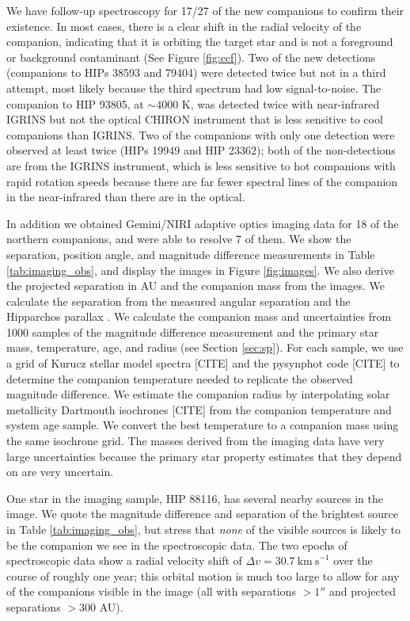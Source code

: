 \documentclass{emulateapj}
\begin{document}
We have follow-up spectroscopy for 17/27 of the new companions to confirm their existence. In most cases, there is a clear shift in the radial velocity of the companion, indicating that it is orbiting the target star and is not a foreground or background contaminant (See Figure \ref{fig:ccf}). Two of the new detections (companions to HIPs 38593 and 79404) were detected twice but not in a third attempt, most likely because the third spectrum had low signal-to-noise. The companion to HIP 93805, at $\sim 4000$ K, was detected twice with near-infrared IGRINS but not the optical CHIRON instrument that is less sensitive to cool companions than IGRINS. Two of the companions with only one detection were observed at least twice (HIPs 19949 and HIP 23362); both of the non-detections are from the IGRINS instrument, which is less sensitive to hot companions with rapid rotation speeds because there are far fewer spectral lines of the companion in the near-infrared than there are in the optical.


In addition we obtained Gemini/NIRI adaptive optics imaging data for 18 of the northern companions, and were able to resolve 7 of them. We show the separation, position angle, and magnitude difference measurements in Table \ref{tab:imaging_obs}, and display the images in Figure \ref{fig:images}. We also derive the projected separation in AU and the companion mass from the images. We calculate the separation from the measured angular separation and the Hipparchos parallax \citep{Hipparchos}. We calculate the companion mass and uncertainties from 1000 samples of the magnitude difference measurement and the primary star mass, temperature, age, and radius (see Section \ref{sec:sp}). For each sample, we use a grid of Kurucz stellar model spectra [CITE] and the pysynphot code [CITE] to determine the companion temperature needed to replicate the observed magnitude difference. We estimate the companion radius by interpolating solar metallicity Dartmouth isochrones [CITE] from the companion temperature and system age sample. We convert the best temperature to a companion mass using the same isochrone grid. The masses derived from the imaging data have very large uncertainties because the primary star property estimates that they depend on are very uncertain.

One star in the imaging sample, HIP 88116, has several nearby sources in the image. We quote the magnitude difference and separation of the brightest source in Table \ref{tab:imaging_obs}, but stress that \emph{none} of the visible sources is likely to be the companion we see in the spectroscopic data. The two epochs of spectroscopic data show a radial velocity shift of $\Delta v = 30.7\ \mathrm{km\ s}^{-1}$ over the course of roughly one year; this orbital motion is much too large to allow for any of the companions visible in the image (all with separations $ > 1''$ and projected separations $ > 300$ AU).
\end{document}
